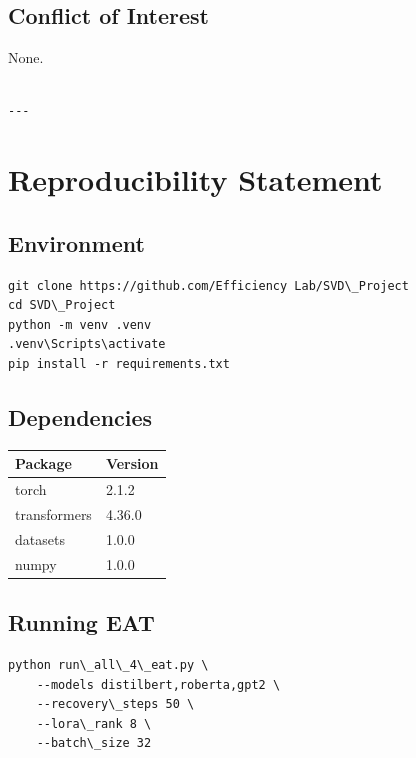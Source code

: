 \subsection{Conflict of Interest}

None.
\begin{lstlisting}

---
\end{lstlisting}


\section{Reproducibility Statement}

\subsection{Environment}

\begin{lstlisting}
git clone https://github.com/Efficiency Lab/SVD\_Project
cd SVD\_Project
python -m venv .venv
.venv\Scripts\activate
pip install -r requirements.txt
\end{lstlisting}

\subsection{Dependencies}

\begin{table}[H]
\centering
\small
\begin{tabular}{ll}
\toprule
\textbf{Package} & \textbf{Version} \\
\midrule
torch & 2.1.2 \\
transformers & 4.36.0 \\
datasets & 1.0.0 \\
numpy & 1.0.0 \\
\bottomrule
\end{tabular}
\end{table}

\subsection{Running EAT}

\begin{lstlisting}
python run\_all\_4\_eat.py \
    --models distilbert,roberta,gpt2 \
    --recovery\_steps 50 \
    --lora\_rank 8 \
    --batch\_size 32
\end{lstlisting}


